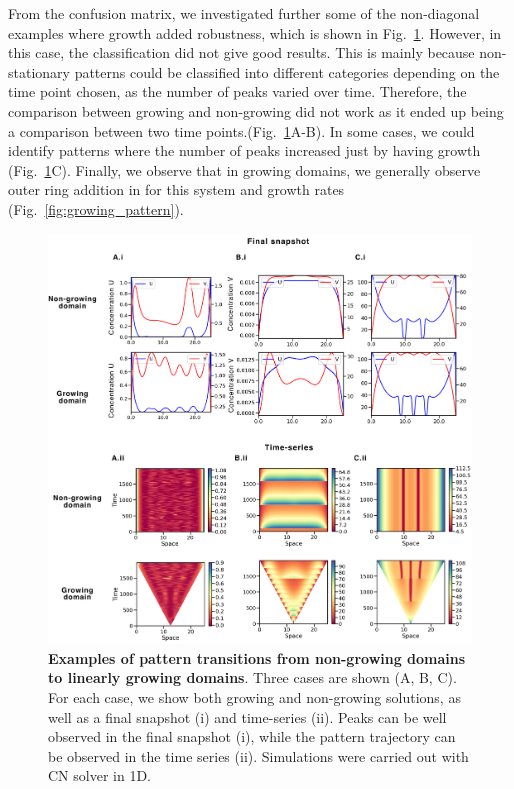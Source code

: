 From the confusion matrix, we investigated further some of the non-diagonal examples where growth added robustness, which is shown in Fig.~\ref{fig:interesting_cases_edgegrowth2}.
 However, in this case, the classification did not give good results.
This is mainly because non-stationary patterns could be classified into different categories depending on the time point chosen, as the number of peaks varied over time.
Therefore, the comparison between growing and non-growing did not work as it ended up being a comparison between two time points.(Fig.~\ref{fig:interesting_cases_edgegrowth2}A-B).
In some cases, we could identify patterns where the number of peaks increased just by having growth (Fig.~\ref{fig:interesting_cases_edgegrowth2}C).
Finally, we observe that in growing domains, we generally observe outer ring addition in for this system and growth rates (Fig.~\ref{fig:growing_pattern}).
\begin{figure}[H] %

    \centering
    \begin{adjustbox}{center}
        \includegraphics[width=1\textwidth]{chapters/Chapter 1/interesting_cases_edgegrowth2} %
    \end{adjustbox}
    \caption{\textbf{Examples of pattern transitions from non-growing domains to linearly growing domains}. Three cases are shown (A, B, C). For each case, we show both growing and non-growing solutions, as well as a final snapshot (i) and time-series (ii). Peaks can be well observed in the final snapshot (i), while the pattern trajectory can be observed in the time series (ii). Simulations were carried out with CN solver in 1D.}
    \label{fig:interesting_cases_edgegrowth2}
\end{figure}
